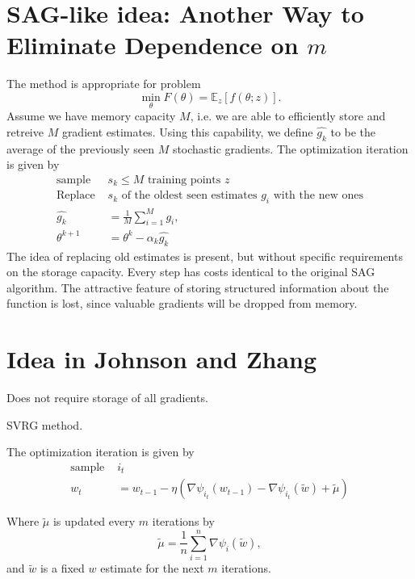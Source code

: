 \documentclass[12pt]{article}
\begin{document}
	\section{SAG-like idea: Another Way to  Eliminate Dependence on $m$}
	 The method is appropriate for problem
	\begin{equation}
		\min_{\theta} F(\theta) = \mathbb{E}_{z}[ f(\theta;z)].
	\end{equation}
	Assume we have memory capacity $M$, i.e. we are able to efficiently store and retreive $M$ gradient estimates. Using this capability, we define $\hat{g_k}$ to be the average of the previously seen $M$ stochastic gradients. The optimization iteration is given by	
	 \begin{align}
	   \mbox{sample } &s_k \leq M \mbox{ training points } z \\
	   \mbox{Replace } & s_k \mbox{ of the oldest seen estimates $g_i$ with the new ones}\\
	   \hat{g_k} &= \frac{1}{M} \sum_{i=1}^{M} g_i, \\
	   \theta^{k+1} &= \theta^k - \alpha_k \hat{g_k}
	\end{align}
	The idea of replacing old estimates is present, but without specific requirements on the storage capacity. Every step has costs identical to the original SAG algorithm. The attractive feature of storing structured information about the function is lost, since valuable gradients will be dropped from memory.\\
		
	 
	 
	\section{Idea in Johnson and Zhang}
	Does not require storage of all gradients.
	
	SVRG method.
	
	The optimization iteration is given by	
		 \begin{align}
		   \mbox{sample } & i_t \\
		   w_t &= w_{t-1} - \eta (  \nabla \psi_{i_t} (w_{t-1}) -   \nabla \psi_{i_t} (\tilde{w})  +\tilde{\mu} )
		\end{align}
		
		Where $\tilde{\mu}$ is updated every $m$ iterations by 
		\begin{equation}
			\tilde{\mu} = \frac{1}{n} \sum_{i=1}^{n} \nabla \psi_i(\tilde{w}),
	    \end{equation}
		and $\tilde{w}$ is a fixed $w$ estimate for the next $m$ iterations.
		
\end{document}
